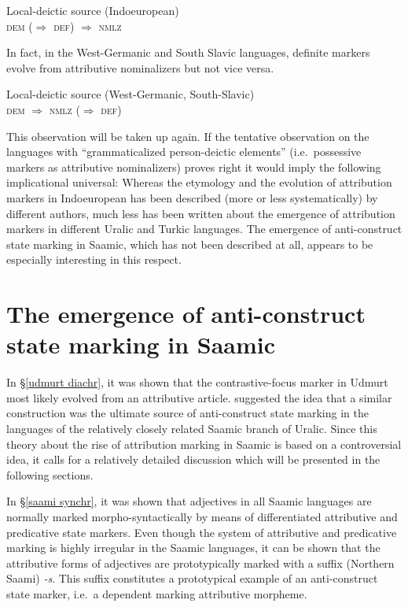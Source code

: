 {\begin{exe}
\ex Local-deictic source (Indoeuropean)\\
	\textsc{dem ($\Rightarrow$ def) $\Rightarrow$ nmlz}
\end{exe}
In fact, in the West-Germanic and South Slavic languages, definite markers evolve from attributive nominalizers but not vice versa. 
\begin{exe}
\ex Local-deictic source (West-Germanic, South-Slavic)\\
	\textsc{dem $\Rightarrow$ nmlz ($\Rightarrow$ def)}
\end{exe}
This observation will be taken up again. If the tentative observation on the languages with “grammaticalized person-deictic elements” (i.e.~possessive markers as attributive nominalizers) proves right it would imply the following implicational universal:
Whereas the etymology and the evolution of attribution markers in Indoeuropean has been described (more or less systematically) by different authors, much less has been written about the emergence of attribution markers in different Uralic and Turkic languages. The emergence of anti-construct state marking in Saamic, which has not been described at all, appears to be especially interesting in this respect.

\section[Anti-construct state in Saamic]{The emergence of anti-construct state marking in Saamic} \label{saamic diachr}
In \S\ref{udmurt diachr}, it was shown that the contrastive-focus marker in Udmurt most likely evolved from an attributive article. \cite{riesler2006b} suggested the idea that a similar construction was the ultimate source of anti-construct state marking in the languages of the relatively closely related Saamic branch of Uralic. Since this theory about the rise of attribution marking in Saamic is based on a controversial idea, it calls for a relatively detailed discussion which will be presented in the following sections.

In \S\ref{saami synchr}, it was shown that adjectives in all Saamic languages are normally marked morpho-syntactically by means of differentiated attributive and predicative state markers. Even though the system of attributive and predicative marking is highly irregular in the Saamic languages, it can be shown that the attributive forms of adjectives are prototypically marked with a suffix (Northern Saami) \textit{-s}. This suffix constitutes a prototypical example of an anti-construct state marker, i.e.~a dependent marking attributive morpheme.

}
